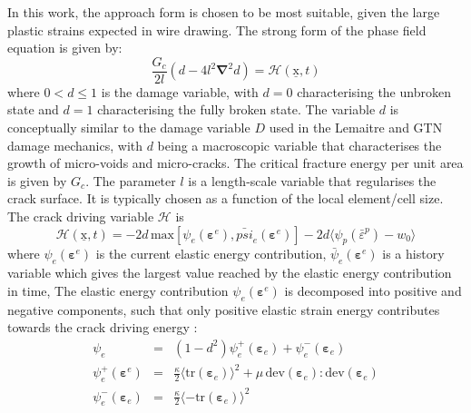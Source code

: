 \documentclass[sn-mathphys,Numbered,draft]{sn-jnl}%
\newcommand{\bb}{\boldsymbol}
\begin{document}
In this work, the approach form \citet{borden_phase-field_2016} is chosen to be most suitable, given the large plastic strains expected in wire drawing.
The strong form of the phase field equation is given by:
\begin{equation} \label{eqn:phaseFieldEquation}
	\frac{G_c}{2l} \left(d - 4 l^2 \bb{\nabla}^2 d \right) = \mathcal{H} \left(\underline{\mathrm{x}},t \right)	
\end{equation}
where $0 < d \leq 1$ is the damage variable, with $d = 0$ characterising the unbroken state and $d = 1$ characterising the fully broken state. 
The variable $d$ is conceptually similar to the damage variable $D$ used in the Lemaitre and GTN damage mechanics, with $d$ being a macroscopic variable that characterises the growth of micro-voids and micro-cracks.
The critical fracture energy per unit area is given by $G_c$.
The parameter $l$ is a length-scale variable that regularises the crack surface. It is typically chosen as a function of the local element/cell size.
The crack driving variable $\mathcal{H}$ is
\begin{equation}
	\mathcal{H}\left(\underline{\mathrm{x}},t\right)=
		-2d \,
		\text{max}
		\left[
			\psi_e
			\left(\bb{\varepsilon}^e\right),
			\bar{psi}_{e}\left(\bb{\varepsilon}^e\right)
		\right]
	-2d
	\langle \psi_p({\bar{\varepsilon}}^p)-w_0 \rangle
\end{equation}
where $\psi_e \left(\mathbf{\varepsilon}^e\right)$ is the current elastic energy contribution, $\bar{\psi}_e \left(\mathbf{\varepsilon}^e\right)$ is a history variable which gives the largest value reached by the elastic energy contribution in time, 
The elastic energy contribution $\psi_e \left(\mathbf{\varepsilon}^e\right)$ is decomposed into positive and negative components, such that only positive elastic strain energy contributes towards the crack driving energy \citep{amor_regularized_2009}:
\begin{eqnarray}
	\psi_e &=&
	(1 - d^2) \psi_{e}^{+} \left(\bb{\varepsilon}_e \right)
	+ \psi_{e}^{-} \left(\bb{\varepsilon}_e \right) \\
	\psi_e^{+}\left(\bb{\varepsilon}^{e}\right) &=&
	\frac{\kappa}{2} \langle \text{tr}\left(\bb{\varepsilon}_{e}\right)\rangle^2
	+\mu \,\text{dev}(\bb{\varepsilon}_e): \text{dev}(\bb{\varepsilon}_e) \\
    	\psi_e^{-} \left(\bb{\varepsilon}_{e}\right) &=&
	\frac{\kappa}{2} \langle-\text{tr}\left(\bb{\varepsilon}_{e}\right) \rangle^2
\end{eqnarray}
\end{document}
